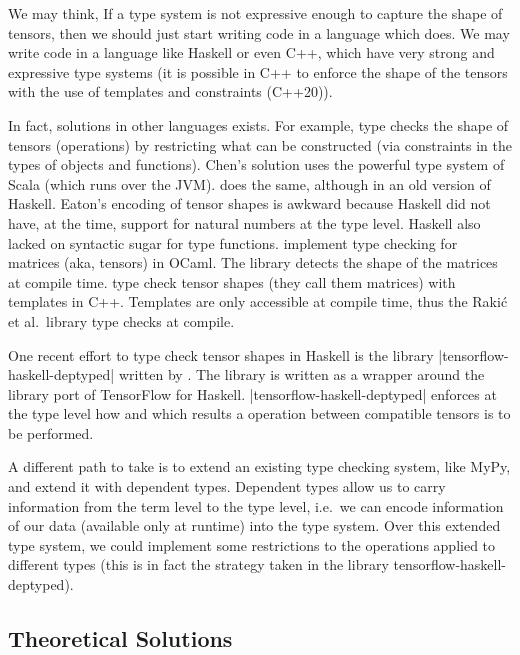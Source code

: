 We may think, If a type system is not expressive enough to capture the
shape of tensors, then we should just start writing code in a language
which does. We may write code in a language like Haskell or even C++,
which have very strong and expressive type systems (it is possible in
C++ to enforce the shape of the tensors with the use of templates and
constraints (C++20)).

In fact, solutions in other languages exists. For example,
\textcite{chen_typesafe_2017} type checks the shape of tensors
(operations) by restricting what can be constructed (via constraints in
the types of objects and functions). Chen's solution uses the powerful
type system of Scala (which runs over the JVM).
\textcite{eaton_statically_2006} does the same, although in an old
version of Haskell. Eaton's encoding of tensor shapes is awkward because
Haskell did not have, at the time, support for natural numbers at the
type level. Haskell also lacked on syntactic sugar for type functions.
\textcite{abe_simple_2015} implement type checking for matrices (aka,
tensors) in OCaml. The library detects the shape of the matrices at
compile time. \textcite{rakic_statically_2012} type check tensor shapes
(they call them matrices) with templates in C++. Templates are only
accessible at compile time, thus the Rakić et al.~library type checks at
compile.

One recent effort to type check tensor shapes in Haskell is the library
\pycode|tensorflow-haskell-deptyped| written by
\textcite{elkin_haskell_2018}. The library is written as a wrapper
around the library port of TensorFlow for Haskell.
\pycode|tensorflow-haskell-deptyped| enforces at the type level how and
which results a operation between compatible tensors is to be performed.

A different path to take is to extend an existing type checking system,
like MyPy, and extend it with dependent types. Dependent types allow us
to carry information from the term level to the type level, i.e.~we can
encode information of our data (available only at runtime) into the type
system. Over this extended type system, we could implement some
restrictions to the operations applied to different types (this is in
fact the strategy taken in the library tensorflow-haskell-deptyped).

\subsection{Theoretical Solutions}\label{theoretical-solutions}

